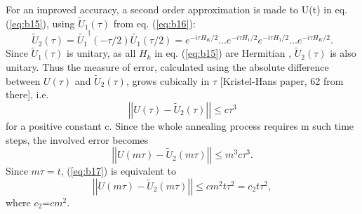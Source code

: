 \documentclass[../main.tex]{subfiles}
\begin{document}
For an improved accuracy, a second order approximation is made to U(t) in eq. (\ref{eq:b15}), using $\tilde{U}_1(\tau)$ from eq. (\ref{eq:b16}):
\begin{equation}
\tilde{U}_2(\tau)=\tilde{U_1}^{\dagger}(-\tau/2)\tilde{U_1}(\tau /2)=e^{-i\tau H_K/2}...e^{-i\tau H_1/2}e^{-i\tau H_1/2}...e^{-i\tau H_K/2}.
\end{equation}
Since $\tilde{U}_1(\tau)$ is unitary, as all $H_k$ in eq. (\ref{eq:b15}) are Hermitian , $\tilde{U}_2(\tau)$ is also unitary. Thus the measure of error, calculated using the absolute difference between $U(\tau)$ and  $\tilde{U}_2(\tau)$, grows cubically in $\tau$ [Kristel-Hans paper, 62 from there], i.e.
\begin{equation}
\left| \left| U(\tau)-\tilde{U}_2(\tau) \right| \right| \leq c\tau ^3    
\end{equation} 
for a positive constant c. Since the whole annealing process requires m such time steps, the involved error becomes
\begin{equation}
\left| \left| U(m \tau)-\tilde{U}_2(m \tau) \right| \right| \leq m^3 c \tau^3.  \label{eq:b17}
\end{equation}
Since $m \tau=t$, (\ref{eq:b17}) is equivalent to
\begin{equation}
\left| \left| U(m \tau)-\tilde{U}_2(m \tau) \right| \right| \leq cm^2t\tau^2 = c_2t\tau^2, \label{eq:b18}
\end{equation}
where $c_2$=$cm^2$.\\
\end{document}
